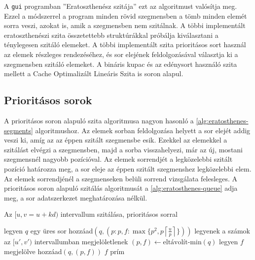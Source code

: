 A \texttt{gui} programban ''Eratoszthenész szitája'' ezt az algoritmust valósítja meg.
Ezzel a módszerrel a program minden rövid szegmensben a tömb minden elemét sorra veszi, azokat is, amik a szegmensben nem szitálnak.
A többi implementált eratoszthenészi szita összetettebb struktúrákkal próbálja kiválasztani a ténylegesen szitáló elemeket.
A többi implementált szita prioritásos sort használ az elemek részleges rendezéséhez, és sor elejének feldolgozásával választja ki a szegmensben szitáló elemeket.
A bináris kupac és az edénysort használó szita mellett a Cache Optimalizált Lineáris Szita is soron alapul.

\subsection{Prioritásos sorok}

A prioritásos soron alapuló szita algoritmusa nagyon hasonló a \ref{alg:eratosthenes-segments} algoritmushoz.
Az elemek sorban feldolgozása helyett a sor elejét addig veszi ki, amíg az az éppen szitált szegmensbe esik.
Ezekkel az elemekkel a szitálást elvégzi a szegmensben, majd a sorba visszahelyezi, már az új, mostani szegmensnél nagyobb pozícióval.
Az elemek sorrendjét a legközelebbi szitált pozíció határozza meg, a sor eleje az éppen szitált szegmenshez legközelebbi elem.
Az elemek sorrendjénél a szegmenseken belüli sorrend vizsgálata felesleges.
A prioritásos soron alapuló szitálás algoritmusát a \ref{alg:eratosthenes-queue} adja meg, a sor adatszerkezet meghatározása nélkül.

\begin{algorithm}[H]
\caption{Az $[u, v=u+kd)$ intervallum szitálása, prioritásos sorral}
\label{alg:eratosthenes-queue}
\begin{algorithmic}[1]
\State legyen $q$ egy üres sor
	\State hozzáad$(q, (p: p, f: \max \lbrace p^2, p \left \lceil{\frac{u}{p}}\right \rceil \rbrace ))$
\EndFor
{}
	\State legyenek a számok az $[u', v')$ intervallumban megjelöletlenek
		\State $(p, f) \gets \textrm{eltávolít-min}(q)$
			\State legyen $f$ megjelölve
		\EndFor
		\State hozzáad$(q, (p, f))$
	\EndWhile
	\For{$f \in [u', v')$}
			\State $f$ prím
		\EndIf
	\EndFor
\EndFor
\end{algorithmic}
\end{algorithm}

